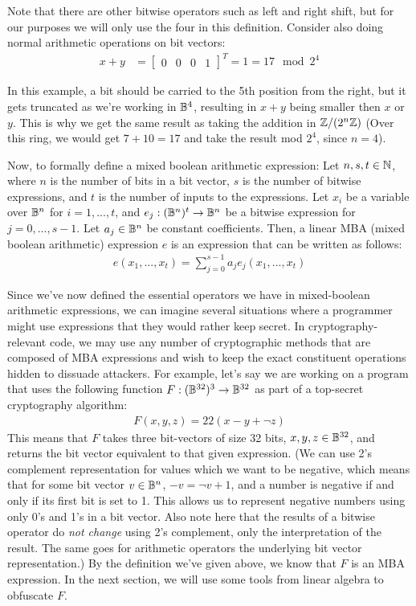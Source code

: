 Note that there are other bitwise operators such as left and right shift, but for our
purposes we will only use the four in this definition. Consider also doing normal arithmetic operations on bit vectors:
\begin{align*}
x + y &= \begin{bmatrix}
0 & 0 & 0 & 1
\end{bmatrix}^T = 1 = 17 \mod 2^4
\end{align*}
\par In this example, a bit should be carried to
the 5th position from the right, but it gets truncated as we're working in $\mathbb{B}^4$, resulting
in $x + y$ being smaller then $x$ or $y$.
This is why we get the same result as taking the addition in
$\mathbb{Z}/(2^n\mathbb{Z})$ (Over this ring, we would get $7 + 10 = 17$ and take the result mod $2^4$, 
since $n=4$).
\par Now, to formally define a mixed boolean arithmetic expression:
 {Let $n,s,t \in \mathbb{N}$, where $n$ is the number of bits in a bit vector,
$s$ is the number of bitwise expressions, and $t$ is the number of
inputs to the expressions.
Let $x_i$ be a variable over $\mathbb{B}^n$ for
$i = 1,...,t$, and $e_j : (\mathbb{B}^n)^t \rightarrow \mathbb{B}^n$ be a bitwise expression for
$j = 0,...,s-1$. Let $a_j\in \mathbb{B}^n$ be constant coefficients.
Then, a linear MBA (mixed boolean arithmetic) expression $e$ is an expression that can be written as follows:
\begin{align*}
    e(x_1, ..., x_t) = \sum_{j=0}^{s-1} a_j e_j(x_1,...,x_t)
\end{align*}
}
\par Since we've now defined the essential operators we have in mixed-boolean
arithmetic
expressions, we can imagine several situations where a programmer might use expressions
that they would rather keep secret. In cryptography-relevant code, we may use any
number of cryptographic methods that are composed of MBA
expressions
and wish to keep the exact constituent operations hidden
to dissuade attackers. For example, let's say we are working on a
program that uses the following function $F : (\mathbb{B}^{32})^3 \rightarrow \mathbb{B}^{32}$ as part
of a top-secret cryptography algorithm:
\begin{align*}
    F(x, y, z) = 22(x - y + \neg z)
\end{align*}
This means  that $F$ takes three bit-vectors of size 32 bits, $x, y, z \in \mathbb{B}^{32}$,
and returns the bit vector equivalent to that given expression.
(We can use 2's complement representation for values which we want to be negative,
which means that for some bit vector $v \in \mathbb{B}^n$, $-v = \neg v + 1$,
and a number is negative if and only if its first bit is set to 1.
This allows us to represent negative numbers using only 0's and 1's in a bit vector.
Also note here that the results of a bitwise operator do {\itshape not change}
using 2's complement, only the  interpretation of the result. The same goes for
arithmetic operators the underlying bit vector representation.)
By the definition we've given above, we know that $F$ is an MBA expression.
In the next section,
we will use some tools from linear algebra to obfuscate $F$.
